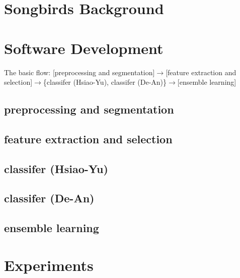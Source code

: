 \section{Songbirds Background}



\section{Software Development}

The basic flow: [preprocessing and segmentation]$\rightarrow$[feature extraction and selection]$\rightarrow$\{classifer (Hsiao-Yu), classifer (De-An)\}$\rightarrow$[ensemble learning]

\subsection{preprocessing and segmentation}



\subsection{feature extraction and selection}



\subsection{classifer (Hsiao-Yu)}


\subsection{classifer (De-An)}


\subsection{ensemble learning}



\section{Experiments}


